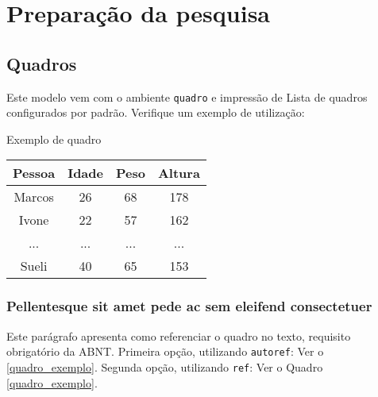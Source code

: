 

\chapter{Preparação da pesquisa}\label{cap_trabalho_academico}

\section{Quadros}

Este modelo vem com o ambiente \texttt{quadro} e impressão de Lista de quadros 
configurados por padrão. Verifique um exemplo de utilização:

\begin{quadro}[htb]
    \caption{\label{quadro_exemplo}Exemplo de quadro}
    \begin{tabular}{|c|c|c|c|}
        \hline
        \textbf{Pessoa} & \textbf{Idade} & \textbf{Peso} & \textbf{Altura} \\ \hline
        Marcos & 26    & 68   & 178    \\ \hline
        Ivone  & 22    & 57   & 162    \\ \hline
        ...    & ...   & ...  & ...    \\ \hline
        Sueli  & 40    & 65   & 153    \\ \hline
    \end{tabular}
\end{quadro}

\subsection{Pellentesque sit amet pede ac sem eleifend consectetuer}
Este parágrafo apresenta como referenciar o quadro no texto, requisito
obrigatório da ABNT. 
Primeira opção, utilizando \texttt{autoref}: Ver o \autoref{quadro_exemplo}. 
Segunda opção, utilizando  \texttt{ref}: Ver o Quadro \ref{quadro_exemplo}.